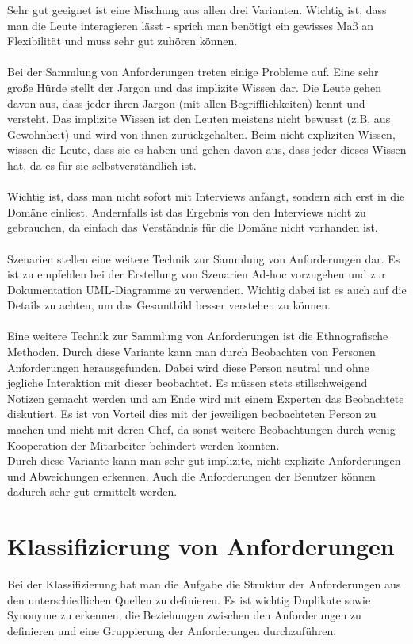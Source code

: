 Sehr gut geeignet ist eine Mischung aus allen drei Varianten. Wichtig ist, dass man die Leute interagieren lässt - sprich man benötigt ein gewisses Maß an Flexibilität und muss sehr gut zuhören können. 
\\\\
Bei der Sammlung von Anforderungen treten einige Probleme auf. Eine sehr große Hürde stellt der Jargon und das implizite Wissen dar. Die Leute gehen davon aus, dass jeder ihren Jargon (mit allen Begrifflichkeiten) kennt und versteht. Das implizite Wissen ist den Leuten meistens nicht bewusst (z.B. aus Gewohnheit) und wird von ihnen zurückgehalten. Beim nicht expliziten Wissen, wissen die Leute, dass sie es haben und gehen davon aus, dass jeder dieses Wissen hat, da es für sie selbstverständlich ist. 
\\\\
Wichtig ist, dass man nicht sofort mit Interviews anfängt, sondern sich erst in die Domäne einliest. Andernfalls ist das Ergebnis von den Interviews nicht zu gebrauchen, da einfach das Verständnis für die Domäne nicht vorhanden ist.
\\\\
Szenarien stellen eine weitere Technik zur Sammlung von Anforderungen dar. Es ist zu empfehlen bei der Erstellung von Szenarien Ad-hoc vorzugehen und zur Dokumentation UML-Diagramme zu verwenden. Wichtig dabei ist es auch auf die Details zu achten, um das Gesamtbild besser verstehen zu können.
\\\\
Eine weitere Technik zur Sammlung von Anforderungen ist die Ethnografische Methoden. Durch diese Variante kann man durch Beobachten von Personen Anforderungen herausgefunden. Dabei wird diese Person neutral und ohne jegliche Interaktion mit dieser beobachtet. Es müssen stets stillschweigend Notizen gemacht werden und am Ende wird mit einem Experten das Beobachtete diskutiert. Es ist von Vorteil dies  mit der jeweiligen beobachteten Person zu machen und nicht mit deren Chef, da sonst weitere Beobachtungen durch wenig Kooperation der Mitarbeiter behindert werden könnten. 
\\
Durch diese Variante kann man sehr gut implizite, nicht explizite Anforderungen und Abweichungen erkennen. Auch die Anforderungen der Benutzer können dadurch sehr gut ermittelt werden. 

\section{Klassifizierung von Anforderungen}
Bei der Klassifizierung hat man die Aufgabe die Struktur der Anforderungen aus den unterschiedlichen Quellen zu definieren. 
Es ist wichtig Duplikate sowie Synonyme zu erkennen, die Beziehungen zwischen den Anforderungen zu definieren und eine Gruppierung der Anforderungen durchzuführen.

